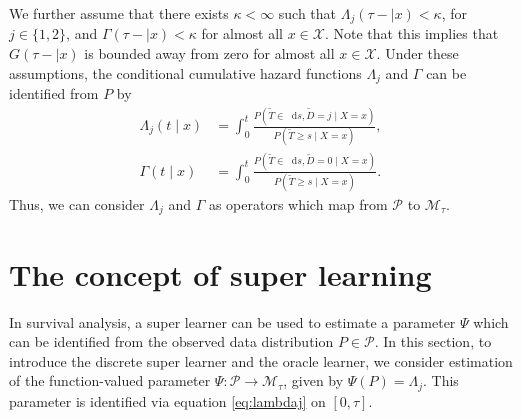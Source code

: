\documentclass[11pt]{article}
\theoremstyle{thmstyleone}%
\theoremstyle{thmstyletwo}%
\theoremstyle{thmstylethree}%
\newcommand*\diff{\mathop{}\!\mathrm{d}}
\newcommand{\1}{\mathds{1}}
\begin{document}
We further assume that there exists \(\kappa<\infty\) such that
\(\Lambda_{j}(\tau- \mid x)<\kappa \), for \(j\in\{1,2\}\), and
\(\Gamma(\tau- \mid x)<\kappa\) for almost all \(x\in\mathcal X\). Note that this
implies that \(G(\tau- \mid x)\) is bounded away from zero for almost all \(x\in\mathcal X\).
Under these assumptions, the conditional cumulative hazard functions
\(\Lambda_{j}\) and \(\Gamma\) can be identified from \(P\) by
\begin{align}
  \Lambda_{j}(t \mid x) &= \int_0^t\frac{  P(\tilde T \in \diff s, \tilde D=j \mid X=x )}{P(\tilde T \geq s \mid X=x )}, \label{eq:lambdaj}\\
  \Gamma(t \mid x) &= \int_0^t\frac{  P(\tilde T \in \diff s, \tilde D=0 \mid X=x )}{P(\tilde T \geq s \mid X=x )}\label{eq:gamma}.
\end{align}
Thus, we can consider $\Lambda_j$ and \(\Gamma\) as operators which map from
\( \mathcal{P} \) to \(\mathcal M_{\tau}\).

 
\section{The concept of super learning}
\label{sec:super-learning}

In survival analysis, a super learner can be used to estimate a
parameter $\Psi$ which can be identified from the observed data
distribution \(P\in\mathcal P\). In this section, to introduce the
discrete super learner and the oracle learner, we consider estimation of the
function-valued parameter \(\Psi:\mathcal P\to\mathcal M_{\tau}\), given by
\(\Psi(P)=\Lambda_j\). This parameter is identified via equation
\eqref{eq:lambdaj} on \([0,\tau]\).
\end{document}
